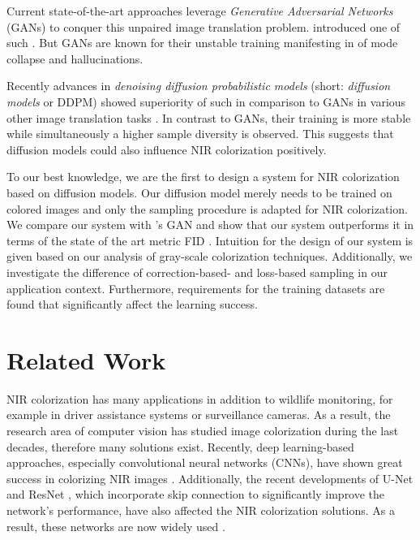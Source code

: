 Current state-of-the-art approaches leverage \textit{Generative Adversarial Networks} (GANs) to conquer this unpaired image translation problem.
 introduced one of such \parencite{mehri}.
But GANs are known for their unstable training manifesting in of mode collapse and hallucinations.

Recently advances in \textit{denoising diffusion probabilistic models} (short: \textit{diffusion models} or DDPM) \parencite{ddpm} showed superiority of such in comparison to GANs in various other image translation tasks \parencite{diffusion-beats-gans,sbgm}.
In contrast to GANs, their training is more stable while simultaneously a higher sample diversity is observed.
This suggests that diffusion models could also influence NIR colorization positively.

To our best knowledge, we are the first to design a system for NIR colorization based on diffusion models.
Our diffusion model merely needs to be trained on colored images and only the sampling procedure is adapted for NIR colorization.
We compare our system with \textcite{mehri}'s GAN and show that our system outperforms it in terms of the state of the art metric FID \parencite{ttur}.
Intuition for the design of our system is given based on our analysis of gray-scale colorization techniques.
Additionally, we investigate the difference of correction-based- and loss-based sampling in our application
context.
Furthermore, requirements for the training datasets are found that significantly affect the learning success.

\section{Related Work}
NIR colorization has many applications in addition to wildlife monitoring, for example in driver assistance systems or surveillance cameras.
As a result, the research area of computer vision has studied image colorization during the last decades, therefore many solutions exist.
Recently, deep learning-based approaches, especially convolutional neural networks (CNNs), have shown great success in colorizing NIR images \parencite{limmer}.
Additionally, the recent developments of U-Net \parencite{unet} and ResNet \parencite{resnet}, which incorporate skip connection to significantly improve the network's performance, have also affected
the NIR colorization solutions. As a result, these networks are now widely used \parencite{cyclegan-original,mehri,cut,s-shape}.

